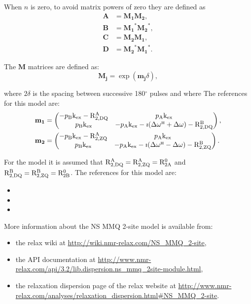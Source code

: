 When $n$ is zero, to avoid matrix powers of zero they are defined as
\begin{subequations}
\begin{align}
    \mathbf{A} &= \mathbf{M_1} \mathbf{M_2}, \\
    \mathbf{B} &= \mathbf{M_1}^* \mathbf{M_2}^*, \\
    \mathbf{C} &= \mathbf{M_2} \mathbf{M_1}, \\
    \mathbf{D} &= \mathbf{M_2}^* \mathbf{M_1}^*.
\end{align}
\end{subequations}

The $\mathbf{M}$ matrices are defined as:
\begin{equation}
    \mathbf{M_j} = \exp(\mathbf{m_j}\delta),
\end{equation}

where $2\delta$ is the spacing between successive 180$^\circ$ pulses and where
The references for this model are:
\begin{subequations}
\begin{align}
    \mathbf{m_1} &= \begin{pmatrix}
                        -p_{\textrm{B}}\textrm{k}_{\textrm{ex}} - \mathrm{R}_{\mathrm{2,DQ}}^{\mathrm{A}} & p_{\textrm{A}}\textrm{k}_{\textrm{ex}} \\
                        p_{\textrm{B}}\textrm{k}_{\textrm{ex}} & - p_{\textrm{A}}\textrm{k}_{\textrm{ex}} -\imath(\Delta\omega^{\scriptscriptstyle\mathrm{H}} + \Delta\omega) - \mathrm{R}_{\mathrm{2,DQ}}^{\mathrm{B}} 
                    \end{pmatrix}, \\
    \mathbf{m_2} &=  \begin{pmatrix}
                        -p_{\textrm{B}}\textrm{k}_{\textrm{ex}} - \mathrm{R}_{\mathrm{2,ZQ}}^{\mathrm{A}} & p_{\textrm{A}}\textrm{k}_{\textrm{ex}} \\
                        p_{\textrm{B}}\textrm{k}_{\textrm{ex}} & - p_{\textrm{A}}\textrm{k}_{\textrm{ex}} -\imath(\Delta\omega^{\scriptscriptstyle\mathrm{H}} - \Delta\omega) - \mathrm{R}_{\mathrm{2,ZQ}}^{\mathrm{B}} 
                    \end{pmatrix}.
\end{align}
\end{subequations}

For the model it is assumed that $\mathrm{R}_{\mathrm{2,DQ}}^{\mathrm{A}} = \mathrm{R}_{\mathrm{2,ZQ}}^{\mathrm{A}} = \mathrm{R}_{\mathrm{2A}}^0$ and $\mathrm{R}_{\mathrm{2,DQ}}^{\mathrm{B}} = \mathrm{R}_{\mathrm{2,ZQ}}^{\mathrm{B}} = \mathrm{R}_{\mathrm{2B}}^0$.
The references for this model are:
\begin{itemize}
  \item {}
  \item {}
  \item {}
\end{itemize}

More information about the NS MMQ 2-site model is available from:
\begin{itemize}
  \item the relax wiki at \url{http://wiki.nmr-relax.com/NS\_MMQ\_2-site},
  \item the API documentation at \url{http://www.nmr-relax.com/api/3.2/lib.dispersion.ns\_mmq\_2site-module.html},
  \item the relaxation dispersion page of the relax website at \url{http://www.nmr-relax.com/analyses/relaxation\_dispersion.html#NS\_MMQ\_2-site}.
\end{itemize}


